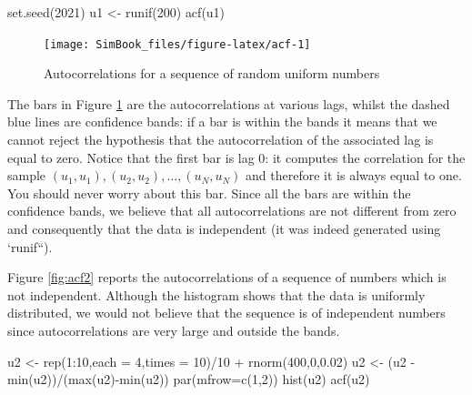 \documentclass[
]{book}
\newenvironment{Shaded}{\begin{snugshade}}{\end{snugshade}}
\newcommand{\AttributeTok}[1]{\textcolor[rgb]{0.77,0.63,0.00}{#1}}
\newcommand{\DecValTok}[1]{\textcolor[rgb]{0.00,0.00,0.81}{#1}}
\newcommand{\FloatTok}[1]{\textcolor[rgb]{0.00,0.00,0.81}{#1}}
\newcommand{\FunctionTok}[1]{\textcolor[rgb]{0.00,0.00,0.00}{#1}}
\newcommand{\NormalTok}[1]{#1}
\newcommand{\OtherTok}[1]{\textcolor[rgb]{0.56,0.35,0.01}{#1}}
\newcommand{\SpecialCharTok}[1]{\textcolor[rgb]{0.00,0.00,0.00}{#1}}
\begin{document}
\begin{Shaded}
\begin{Highlighting}[]
\FunctionTok{set.seed}\NormalTok{(}\DecValTok{2021}\NormalTok{)}
\NormalTok{u1 }\OtherTok{\textless{}{-}} \FunctionTok{runif}\NormalTok{(}\DecValTok{200}\NormalTok{)}
\FunctionTok{acf}\NormalTok{(u1)}
\end{Highlighting}
\end{Shaded}

\begin{figure}

{\centering \texttt{[image: SimBook\_files/figure-latex/acf-1]} 

}

\caption{Autocorrelations for a sequence of random uniform numbers}\label{fig:acf}
\end{figure}

The bars in Figure \ref{fig:acf} are the autocorrelations at various lags, whilst the dashed blue lines are confidence bands: if a bar is within the bands it means that we cannot reject the hypothesis that the autocorrelation of the associated lag is equal to zero. Notice that the first bar is lag 0: it computes the correlation for the sample \((u_1,u_1),(u_2,u_2),\dots,(u_N,u_N)\) and therefore it is always equal to one. You should never worry about this bar. Since all the bars are within the confidence bands, we believe that all autocorrelations are not different from zero and consequently that the data is independent (it was indeed generated using `runif``).

Figure \ref{fig:acf2} reports the autocorrelations of a sequence of numbers which is not independent. Although the histogram shows that the data is uniformly distributed, we would not believe that the sequence is of independent numbers since autocorrelations are very large and outside the bands.

\begin{Shaded}
\begin{Highlighting}[]
\NormalTok{u2 }\OtherTok{\textless{}{-}} \FunctionTok{rep}\NormalTok{(}\DecValTok{1}\SpecialCharTok{:}\DecValTok{10}\NormalTok{,}\AttributeTok{each =} \DecValTok{4}\NormalTok{,}\AttributeTok{times =} \DecValTok{10}\NormalTok{)}\SpecialCharTok{/}\DecValTok{10} \SpecialCharTok{+} \FunctionTok{rnorm}\NormalTok{(}\DecValTok{400}\NormalTok{,}\DecValTok{0}\NormalTok{,}\FloatTok{0.02}\NormalTok{) }
\NormalTok{u2 }\OtherTok{\textless{}{-}}\NormalTok{ (u2 }\SpecialCharTok{{-}} \FunctionTok{min}\NormalTok{(u2))}\SpecialCharTok{/}\NormalTok{(}\FunctionTok{max}\NormalTok{(u2)}\SpecialCharTok{{-}}\FunctionTok{min}\NormalTok{(u2))}
\FunctionTok{par}\NormalTok{(}\AttributeTok{mfrow=}\FunctionTok{c}\NormalTok{(}\DecValTok{1}\NormalTok{,}\DecValTok{2}\NormalTok{))}
\FunctionTok{hist}\NormalTok{(u2)}
\FunctionTok{acf}\NormalTok{(u2)}
\end{Highlighting}
\end{Shaded}
\end{document}
